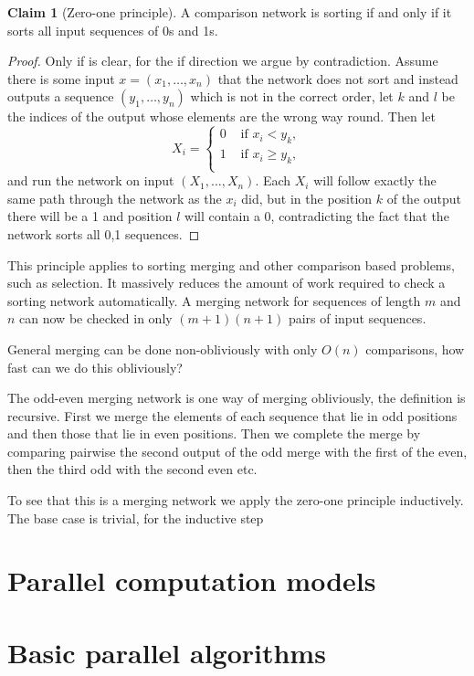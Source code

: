 \documentclass[11pt,a4paper]{article}
\theoremstyle{definition}
\newtheorem{claim}{Claim}
\begin{document}
\begin{claim}[Zero-one principle]
A comparison network is sorting if and only if it sorts all input sequences of 0s and 1s.
\end{claim}
\begin{proof}
Only if is clear, for the if direction we argue by contradiction.
Assume there is some input $x= (x_1,\ldots,x_n)$ that the network does not sort and instead outputs a sequence $(y_1,\ldots,y_n)$ which is not in the correct order, let $k$ and $l$ be the indices of the output whose elements are the wrong way round.
Then let 
\[
X_i =\begin{cases}
0 &\text{ if } x_i< y_k, \\
1 &\text{ if } x_i\ge y_k, \\
\end{cases} 
\]
and run the network on input $(X_1,\ldots,X_n)$.
Each $X_i$ will follow exactly the same path through the network as the $x_i$ did, but in the position $k$ of the output there will be a 1 and position $l$ will contain a 0, contradicting the fact that the network sorts all 0,1 sequences.
\end{proof}

This principle applies to sorting merging and other comparison based problems, such as selection.
It massively reduces the amount of work required to check a sorting network automatically.
A merging network for sequences of length $m$ and $n$ can now be checked in only $(m+1)(n+1)$ pairs of input sequences.

General merging can be done non-obliviously with only $O(n)$ comparisons, how fast can we do this obliviously?

The odd-even merging network is one way of merging obliviously, the definition is recursive.
First we merge the elements of each sequence that lie in odd positions and then those that lie in even positions.
Then we complete the merge by comparing pairwise the second output of the odd merge with the first of the even, then the third odd with the second even etc.

To see that this is a merging network we apply the zero-one principle inductively.
The base case is trivial, for the inductive step %

\section{Parallel computation models}

\section{Basic parallel algorithms}
\end{document}
